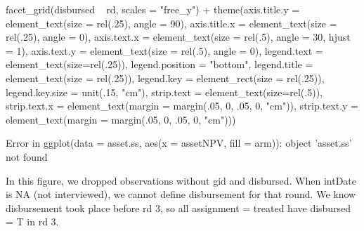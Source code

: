 \begin{Schunk}
\begin{Sinput}
	facet_grid(disbursed ~ rd, scales = "free_y") + 
	theme(axis.title.y = element_text(size = rel(.25), angle = 90), 
		axis.title.x = element_text(size = rel(.25), angle = 0),
		axis.text.x = element_text(size = rel(.5), angle = 30, hjust = 1),
		axis.text.y = element_text(size = rel(.5), angle = 0),
		legend.text = element_text(size=rel(.25)), 
		legend.position = "bottom", 
		legend.title = element_text(size = rel(.25)),
		legend.key = element_rect(size = rel(.25)),
		legend.key.size = unit(.15, "cm"),
		strip.text = element_text(size=rel(.5)),
		strip.text.x = element_text(margin = margin(.05, 0, .05, 0, "cm")),
		strip.text.y = element_text(margin = margin(.05, 0, .05, 0, "cm")))
\end{Sinput}
\begin{Soutput}
Error in ggplot(data = asset.ss, aes(x = assetNPV, fill = arm)): object 'asset.ss' not found
\end{Soutput}
\end{Schunk}
In this figure, we dropped observations without \textsf{gid} and \textsf{disbursed}. When \textsf{intDate} is NA (not interviewed), we cannot define disbursement for that round. We know disbursement took place before rd 3, so all \textsf{assignment} = treated have \textsf{disbursed} = T in rd 3.


